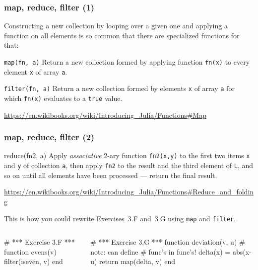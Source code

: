 \documentclass[english,serif,mathserif,xcolor=pdftex,dvipsnames,table]{beamer}
\begin{document}

\begin{frame}[fragile]
  \frametitle{map, reduce, filter (1)}

  Constructing a new collection by looping over a given one and applying a function
  on all elements is so common that there are specialized functions for that:

  \begin{describe}{\texttt{map(fn, a)}}
    Return a new collection formed by applying function \texttt{fn(x)}
    to every element \texttt{x} of array \texttt{a}.
  \end{describe}

  \+
  \begin{describe}{\texttt{filter(fn, a)}}
    Return a new collection formed by elements \texttt{x} of array
    \texttt{a} for which \texttt{fn(x)} evaluates to a \texttt{true} value.
  \end{describe}

  \+
  \begin{seealso}
    \url{https://en.wikibooks.org/wiki/Introducing_Julia/Functions#Map}
  \end{seealso}
\end{frame}


\begin{frame}[fragile]
  \frametitle{map, reduce, filter (2)}

  \begin{describe}{reduce(fn2, a)}
    Apply \emph{associative} 2-ary function \texttt{fn2(x,y)} to the
    first two items \texttt{x} and \texttt{y} of collection \texttt{a}, then
    apply \texttt{fn2} to the result and the third element of
    \texttt{L}, and so on until all elements have been processed ---
    return the final result.
  \end{describe}

  \+
  \begin{seealso}
    \url{https://en.wikibooks.org/wiki/Introducing_Julia/Functions#Reduce_and_folding}
  \end{seealso}
\end{frame}


\begin{frame}[fragile]
  This is how you could rewrite Exercises~3.F and~3.G using \texttt{map} and
  \texttt{filter}.

  \begin{columns}
    \begin{column}{0.5\linewidth}
\begin{jl}
# *** Exercise 3.F ***
function evens(v)
  filter(iseven, v)
end
\end{jl}
\end{column}
\begin{column}{0.5\linewidth}
\begin{jl}
# *** Exercise 3.G ***
function deviation(v, u)
  # note: can define
  # func's in func's!
  delta(x) = abs(x-u)
  return map(delta, v)
end
\end{jl}
\end{column}
\end{columns}
\end{frame}
\end{document}
